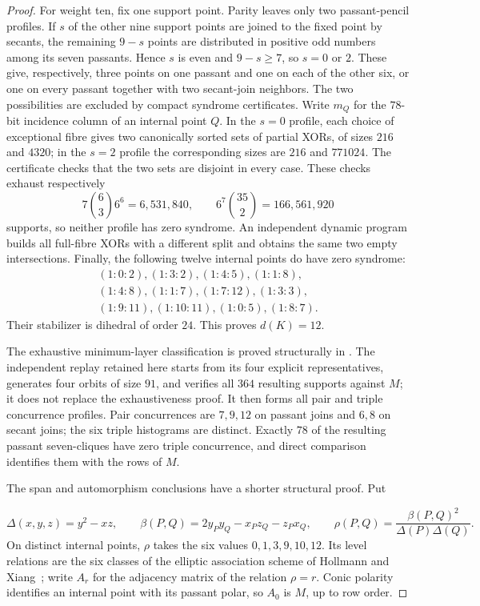 \documentclass[11pt]{article}
\theoremstyle{remark}
\begin{document}
\begin{proof}
For weight ten, fix one support point.  Parity leaves only two passant-pencil
profiles.  If $s$ of the other nine support points are joined to the fixed
point by secants, the remaining $9-s$ points are distributed in positive
odd numbers among its seven passants.  Hence $s$ is even and
$9-s\ge7$, so $s=0$ or $2$.  These give, respectively, three points on one
passant and one on each of the other six, or one on every passant together
with two secant-join neighbors.  The two possibilities are excluded by
compact syndrome certificates.  Write $m_Q$ for the $78$-bit incidence
column of an internal point $Q$.  In the $s=0$ profile, each choice of
exceptional fibre gives two canonically sorted sets of partial XORs, of sizes
$216$ and $4320$; in the $s=2$ profile the corresponding sizes are $216$ and
$771024$.  The certificate checks that the two sets are disjoint in every
case.  These checks exhaust respectively
\[
 7\binom63 6^6=6{,}531{,}840,\qquad
 6^7\binom{35}{2}=166{,}561{,}920
\]
supports, so neither profile has zero syndrome.  An independent dynamic
program builds all full-fibre XORs with a different split and obtains the
same two empty intersections.  Finally, the following
twelve internal points do have zero syndrome:
\[
\begin{gathered}
(1:0:2),(1:3:2),(1:4:5),(1:1:8),\\
(1:4:8),(1:1:7),(1:7:12),(1:3:3),\\
(1:9:11),(1:10:11),(1:0:5),(1:8:7).
\end{gathered}
\]
Their stabilizer is dihedral of order $24$.  This proves $d(K)=12$.

The exhaustive minimum-layer classification is proved structurally in
\cite{RuddPassant2026}.  The independent replay retained here starts
from its four explicit representatives, generates four orbits of size $91$,
and verifies all $364$ resulting supports against $M$; it does not replace the
exhaustiveness proof.  It then forms all pair and triple concurrence
profiles.  Pair concurrences are $7,9,12$ on passant joins and $6,8$ on
secant joins; the six triple histograms are distinct.  Exactly $78$ of the
resulting passant seven-cliques have zero triple concurrence, and direct
comparison identifies them with the rows of $M$.

The span and automorphism conclusions have a shorter structural proof.  Put

\[
 \Delta(x,y,z)=y^2-xz,\qquad
 \beta(P,Q)=2y_Py_Q-x_Pz_Q-z_Px_Q,\qquad
 \rho(P,Q)=\frac{\beta(P,Q)^2}{\Delta(P)\Delta(Q)}.
\]
On distinct internal points, $\rho$ takes the six values
$0,1,3,9,10,12$.  Its level relations are the six classes of the elliptic
association scheme of Hollmann and Xiang~\cite[\S3]{HollmannXiang2006}; write
$A_r$ for the adjacency matrix of the relation $\rho=r$.  Conic polarity
identifies an internal point with its passant polar, so $A_0$ is $M$, up to
row order.


\end{proof}
\end{document}
